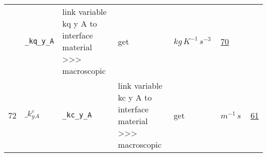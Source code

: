 \begin{longtable}{|p{1cm}|p{2.5cm}|p{4.5cm}|p{8cm}|p{3.0cm}|p{3cm}|p{1cm}|}
             & \verb|_kq_y_A|
             & link variable kq y A to interface material >>> macroscopic
             & \begin{lay}get \end{lay}
             & $ kg \,K^{-1} \,s^{-3} \, $
             &                 \hyperlink{"e:70"}{ 70 }
                 \\
            72
             & \hypertarget{"v:72"}{ $ {{\_k^c_y}}{_{A}} $}
             & \verb|_kc_y_A|
             & link variable kc y A to interface material >>> macroscopic
             & \begin{lay}get \end{lay}
             & $ m^{-1} \,s \, $
             &                 \hyperlink{"e:61"}{ 61 }
                 \\
    \end{longtable}